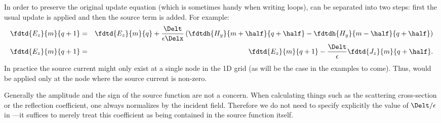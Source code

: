 In order to preserve the original update equation (which is sometimes
handy when writing loops),  can be separated
into two steps: first the usual update is applied and then the source
term is added.  For example:
\begin{eqnarray}
  \fdtd{E_z}{m}{q+1} &=& \fdtd{E_z}{m}{q} + \frac{\Delt}{\epsilon\Delx}
    \left(\fdtdh{H_y}{m+\half}{q+\half} - \fdtdh{H_y}{m-\half}{q+\half}\right) \\
  \fdtd{E_z}{m}{q+1} &=& \fdtd{E_z}{m}{q+1} -
    \frac{\Delt}{\epsilon}\fdtd{J_z}{m}{q+\half}. \label{eq:addCurrent1D}
\end{eqnarray}
In practice the source current might only exist at a single node in
the 1D grid (as will be the case in the examples to come).  Thus,
 would be applied only at the node where the
source current is non-zero.

Generally the amplitude and the sign of the source function are not a
concern.  When calculating things such as the scattering cross-section
or the reflection coefficient, one always normalizes by the incident
field.  Therefore we do not need to specify explicitly the value of
$\Delt/\epsilon$ in ---it suffices to merely
treat this coefficient as being contained in the source function
itself.

